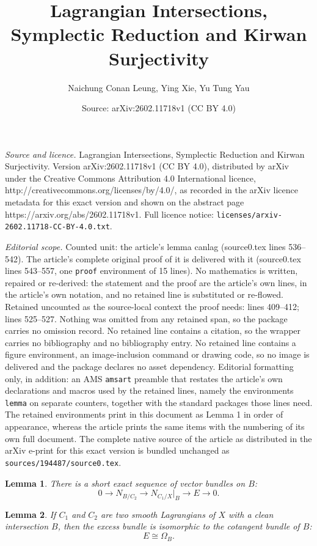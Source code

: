 \documentclass[10pt,a4paper]{amsart}
\title{Lagrangian Intersections, Symplectic Reduction and Kirwan Surjectivity}
\author{Naichung Conan Leung, Ying Xie, Yu Tung Yau}
\date{Source: arXiv:2602.11718v1 (CC BY 4.0)}
\newtheorem{lemma}{Lemma}
\newcommand{\arw}{\longrightarrow}
\begin{document}
\maketitle

\noindent\emph{Source and licence.} Lagrangian Intersections, Symplectic Reduction and Kirwan Surjectivity. Version arXiv:2602.11718v1 (CC BY 4.0), distributed by arXiv under the Creative Commons Attribution 4.0 International licence, http://creativecommons.org/licenses/by/4.0/, as recorded in the arXiv licence metadata for this exact version and shown on the abstract page https://arxiv.org/abs/2602.11718v1. Full licence notice: \texttt{licenses/arxiv-2602.11718-CC-BY-4.0.txt}.\par\smallskip

\noindent\textit{Editorial scope.} Counted unit: the article's lemma canlag (source0.tex lines 536--542). The article's complete original proof of it is delivered with it (source0.tex lines 543--557, one \texttt{proof} environment of 15 lines). No mathematics is written, repaired or re-derived: the statement and the proof are the article's own lines, in the article's own notation, and no retained line is substituted or re-flowed.  Retained uncounted as the source-local context the proof needs: lines 409--412; lines 525--527.  Nothing was omitted from any retained span, so the package carries no omission record.  No retained line contains a citation, so the wrapper carries no bibliography and no bibliography entry.  No retained line contains a figure environment, an image-inclusion command or drawing code, so no image is delivered and the package declares no asset dependency.  Editorial formatting only, in addition: an AMS \texttt{amsart} preamble that restates the article's own declarations and macros used by the retained lines, namely the environments \texttt{lemma} on separate counters, together with the standard packages those lines need.  The retained environments print in this document as Lemma 1 in order of appearance, whereas the article prints the same items with the numbering of its own full document.  The complete native source of the article as distributed in the arXiv e-print for this exact version is bundled unchanged as \texttt{sources/194487/source0.tex}.
\begin{lemma}\label{excess}
   There is a short exact sequence of vector bundles on $B$:
$$0\arw N_{B/C_2}\arw N_{C_1/X}|_B\arw E\arw 0.$$
\end{lemma}

\begin{lemma}\label{exc}
    If $C_1$ and $C_2$ are two smooth Lagrangians of $X$ with a clean intersection $B$, then the excess bundle is isomorphic to the cotangent bundle of $B$: $$E\cong  \Omega_{B}.$$
\end{lemma} 
\end{document}

